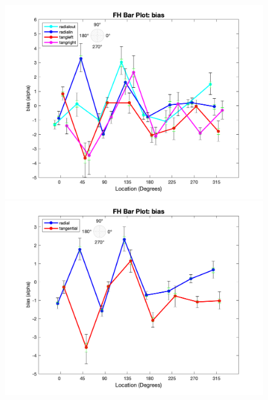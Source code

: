 \documentclass[11pt]{article} %
\begin{document}
\begin{figure}[H]
\centering %
\includegraphics[scale=.3]{Images/FH_LP_bias_Alldata_4conds.png}
\includegraphics[scale=.3]{Images/FH_LP_bias_Alldata_2conds.png}
\end{figure}
\end{document}
